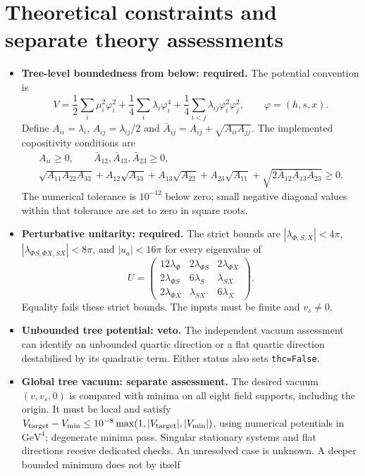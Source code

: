 \documentclass[11pt,a4paper]{article}
\newcommand{\code}[1]{\ifmmode\mbox{\ttfamily\detokenize{#1}}\else\nolinkurl{#1}\fi}
\begin{document}
\section{Theoretical constraints and separate theory assessments}
\begin{itemize}
\item \textbf{Tree-level boundedness from below: required.}
The potential convention is
\[
 V=\frac12\sum_i\mu_i^2\varphi_i^2+
 \frac14\sum_i\lambda_i\varphi_i^4+
 \frac14\sum_{i<j}\lambda_{ij}\varphi_i^2\varphi_j^2,
 \qquad\varphi=(h,s,x).
\]
Define $A_{ii}=\lambda_i$, $A_{ij}=\lambda_{ij}/2$ and
$\bar A_{ij}=A_{ij}+\sqrt{A_{ii}A_{jj}}$. The implemented copositivity
conditions are
\begin{gather*}
 A_{ii}\geq0,\qquad \bar A_{12},\bar A_{13},\bar A_{23}\geq0,\\
 \sqrt{A_{11}A_{22}A_{33}}+A_{12}\sqrt{A_{33}}+
 A_{13}\sqrt{A_{22}}+A_{23}\sqrt{A_{11}}+
 \sqrt{2\bar A_{12}\bar A_{13}\bar A_{23}}\geq0.
\end{gather*}
The numerical tolerance is $10^{-12}$ below zero; small negative diagonal
values within that tolerance are set to zero in square roots.
\item \textbf{Perturbative unitarity: required.}
The strict bounds are $|\lambda_{\Phi,S,X}|<4\pi$,
$|\lambda_{\Phi S,\Phi X,SX}|<8\pi$, and $|u_a|<16\pi$ for every eigenvalue of
\[
 U=\begin{pmatrix}
 12\lambda_\Phi&2\lambda_{\Phi S}&2\lambda_{\Phi X}\\
 2\lambda_{\Phi S}&6\lambda_S&\lambda_{SX}\\
 2\lambda_{\Phi X}&\lambda_{SX}&6\lambda_X
 \end{pmatrix}.
\]
Equality fails these strict bounds. The inputs must be finite and $v_s\ne0$.
\item \textbf{Unbounded tree potential: veto.} The independent vacuum
assessment can identify an unbounded quartic direction or a flat quartic
direction destabilised by its quadratic term. Either status also sets
\code{thc=False}.
\item \textbf{Global tree vacuum: separate assessment.} The desired vacuum
$(v,v_s,0)$ is compared with minima on all eight field supports, including
the origin. It must be local and satisfy
$V_{\rm target}-V_{\min}\leq10^{-8}\max(1,|V_{\rm target}|,|V_{\min}|)$,
using numerical potentials in $\mathrm{GeV}^4$; degenerate minima pass.
Singular stationary systems and flat directions receive dedicated checks.
An unresolved case is unknown. A deeper bounded minimum does not by itself

\end{itemize}
\end{document}
